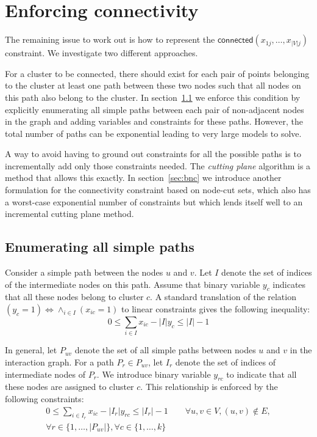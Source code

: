 \documentclass[conference]{IEEEtran}
\begin{document}
\section{Enforcing connectivity}
\label{sec:connectivity}

The remaining issue to work out is how to represent the $\mathsf{connected}(x_{1j}, \ldots, x_{|V|j})$ constraint. We investigate two different approaches.

For a cluster to be connected, there should exist for each pair of points belonging to the cluster at least one path between these two nodes such that all nodes on this path also belong to the cluster. In section~\ref{sec:enumerate} we enforce this condition by explicitly enumerating all simple paths between each pair of non-adjacent nodes in the graph and adding variables and constraints for these paths. However, the total number of paths can be exponential leading to very large models to solve.

A way to avoid having to ground out constraints for all the possible paths is to incrementally add only those constraints needed. The \emph{cutting plane} algorithm is a method that allows this exactly. In section~\ref{sec:bnc} we introduce another formulation for the connectivity constraint based on node-cut sets, which also has a worst-case exponential number of constraints but which lends itself well to an incremental cutting plane method.

\subsection{Enumerating all simple paths}
\label{sec:enumerate}

Consider a simple path between the nodes $u$ and $v$. Let $I$ denote the set of indices of the intermediate nodes on this path. Assume that binary variable $y_c$ indicates that all these nodes belong to cluster $c$. A standard translation of the relation $(y_c=1) \Leftrightarrow \land_{i \in I} (x_{ic}=1)$ to linear constraints gives the following inequality:
%
\begin{equation*}
0 \leq \sum_{i \in I} x_{ic} - |I|y_c \leq |I|-1
\end{equation*}

In general, let $P_{uv}$ denote the set of all simple paths between nodes $u$ and $v$ in the interaction graph. For a path $P_r \in P_{uv}$, let $I_r$ denote the set of indices of intermediate nodes of $P_r$. We introduce binary variable $y_{rc}$ to indicate that all these nodes are assigned to cluster $c$. This relationship is enforced by the following constraints:
\begin{multline}
0 \leq \sum_{i\in I_r} x_{ic} - |I_r| y_{rc} \leq |I_r| - 1 \qquad \forall u, v \in V, (u, v) \notin E, \\
\forall r \in \{1, \ldots, |P_{uv}|\}, \forall c \in \{1, \ldots, k\}
\label{cons:path}
\end{multline}
\end{document}
